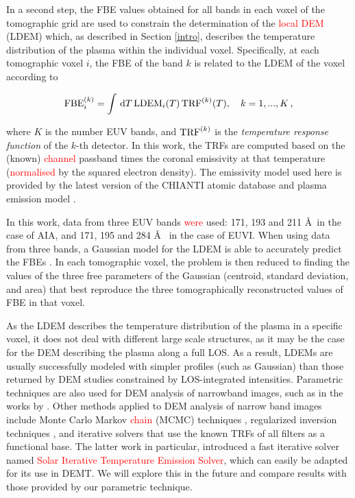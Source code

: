 \documentclass[namedreferences]{solarphysics}
\def\edit#1{\textcolor{Red}{#1}}
\newcommand{\LDEM}{{\rm LDEM}}
\newcommand{\FBE}{{\rm FBE}}
\newcommand{\TRF}{{\rm TRF}}
\begin{document}
\begin{article}
{In a second step, the FBE values obtained for all bands in each voxel {of the tomographic grid are used to constrain the determination of the \edit{local DEM} (LDEM) which, as described in Section \ref{intro}, describes the temperature distribution of the plasma within the individual voxel.} Specifically, at each tomographic voxel $i$, the FBE of the band $k$ is related to the LDEM of the voxel according to}

\begin{equation}\label{fbeldem}
\FBE_i^{(k)}  = \int\,\textrm{d}T\,\LDEM_i(T)\,{\TRF}^{(k)}(T), \ \ \ {k=1,...,K} \,,
\end{equation}

\noindent
{where $K$ is the number EUV bands, and $\TRF^{(k)}$ is the \emph{temperature response function} of the $k$-th detector. In this work, the TRFs are computed based on the (known) \edit{channel} passband times the coronal emissivity at that temperature (\edit{normalised} by the squared electron density). The emissivity model used here is provided by the latest version of the CHIANTI atomic database and plasma emission model \citep{delzanna_2015,landi_2013}.}

{In this work,} data from three EUV bands {\edit{were} used:} 171, 193 and {211 \AA\ in} {the} case of AIA, and 171, 195 and {284 \AA\ } in {the} case of EUVI. When using data from {three bands}, a Gaussian model for the LDEM is able to accurately predict {the FBEs \citep{nuevo_2015}}. In each tomographic voxel, the problem is then reduced to finding the values of the three free parameters of the Gaussian (centroid, standard deviation, and area) that best reproduce the three tomographically reconstructed values of FBE in that voxel.

{As the LDEM describes the temperature distribution of the plasma in a specific voxel, it does not deal with different large scale structures, as it may be the case for the DEM describing the plasma along a full LOS. As a result, LDEMs are usually successfully modeled with simpler profiles (such as Gaussian) than those returned by DEM studies constrained by LOS-integrated intensities. Parametric techniques are also used for DEM analysis of narrowband images, such as in the works by \citet{aschwanden_2011,plowman_2013,delzanna_2013}. Other methods applied to DEM analysis of narrow band images include Monte Carlo Markov \edit{chain} (MCMC) techniques \citep{schmeltz_2016}, regularized inversion techniques \citep{hannah_2012}, and iterative solvers \citep{pickering_2019,morgan_2019} that use the known TRFs of all filters as a functional base. The latter work in particular, introduced a fast iterative solver named \edit{Solar Iterative Temperature Emission Solver}, which can easily be adapted for its use in DEMT. We will explore this in the future and compare results with those provided by our parametric technique.} 


\end{article}
\end{document}
